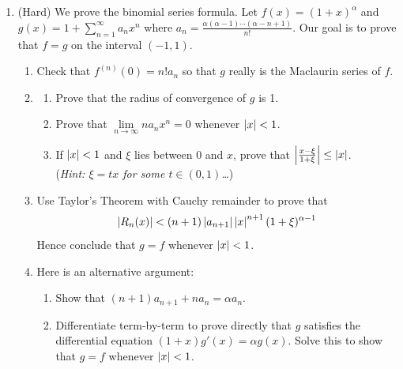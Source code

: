 \begin{exercises}
\begin{enumerate}
 	\item\label{exs:binomialseries} (Hard) We prove the binomial series formula. Let $f(x)=(1+x)^\alpha$ and $g(x)=1+\sum\limits_{n=1}^\infty a_nx^n$ where $a_n=\frac{\alpha(\alpha-1)\cdots(\alpha-n+1)}{n!}$. Our goal is to prove that $f=g$ on the interval $(-1,1)$.
 	\begin{enumerate}
 	  \item Check that $f^{(n)}(0)=n!a_n$ so that $g$ really is the Maclaurin series of $f$.
 	  \item\begin{enumerate}
 	    	\item Prove that the radius of convergence of $g$ is 1.
 	  		\item Prove that $\lim\limits_{n\to\infty}na_nx^n=0$ whenever $\left| x\right|<1$.
 	  		\item If $\left| x\right|<1$ and $\xi$ lies between 0 and $x$, prove that $\left| \frac{x-\xi}{1+\xi}\right|\le\left| x\right|$.\\
 	  		(\emph{Hint: $\xi=tx$ for some $t\in(0,1)$\ldots})
 	  	\end{enumerate}
 	  \item Use Taylor's Theorem with Cauchy remainder to prove that
 	  \[\left| R_n(x)\right|< (n+1)\left| a_{n+1}\right|\left| x\right|^{n+1}(1+\xi)^{\alpha-1}\]
 	  Hence conclude that $g=f$ whenever $\left| x\right|<1$.
 	  \item Here is an alternative argument:
 	  \begin{enumerate}
 	    \item Show that $(n+1)a_{n+1}+na_n=\alpha a_n$.
 	    \item Differentiate term-by-term to prove directly that $g$ satisfies the differential equation $(1+x)g'(x)=\alpha g(x)$. Solve this to show that $g=f$ whenever $\left| x\right|<1$.
 	  \end{enumerate}
 	\end{enumerate}
 	
\end{enumerate}
\end{exercises}



